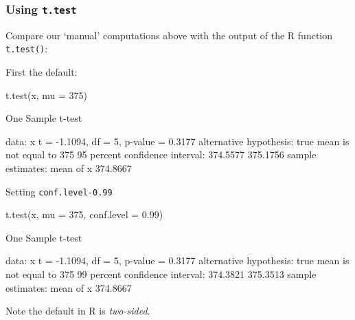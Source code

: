 \documentclass[a4paper]{article}\usepackage[]{graphicx}\usepackage[]{xcolor}
\begin{document}
\subsubsection{Using \lstinline|t.test|}
Compare our `manual' computations above with the output of the R function \lstinline|t.test()|:\\
\begin{minipage}[t]{0.49\textwidth}
First the default:
\begin{Schunk}
\begin{Sinput}
t.test(x, mu = 375)
\end{Sinput}
\begin{Soutput}

	One Sample t-test

data:  x
t = -1.1094, df = 5, p-value = 0.3177
alternative hypothesis: true mean is not equal to 375
95 percent confidence interval:
 374.5577 375.1756
sample estimates:
mean of x 
 374.8667 
\end{Soutput}
\end{Schunk}
\end{minipage}
\hspace{0.02\textwidth}
\begin{minipage}[t]{0.49\textwidth}
Setting \lstinline|conf.level-0.99|
\begin{Schunk}
\begin{Sinput}
t.test(x, mu = 375, conf.level = 0.99)
\end{Sinput}
\begin{Soutput}

	One Sample t-test

data:  x
t = -1.1094, df = 5, p-value = 0.3177
alternative hypothesis: true mean is not equal to 375
99 percent confidence interval:
 374.3821 375.3513
sample estimates:
mean of x 
 374.8667 
\end{Soutput}
\end{Schunk}
\end{minipage}
Note the default in R is \textit{two-sided}.
\end{document}
